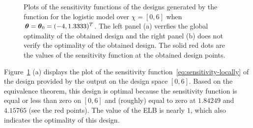   \begin{figure}[h!]
\centering
{}
\caption{
  Plots of the  sensitivity functions  of the designs generated by  the  function for the logistic model over  $\chi =  [0, 6]$ when $\boldsymbol{\theta} = \boldsymbol{\theta}_0 =(-4, 1.3333)^T$. The left panel (a) verrfies the global optimality of the obtained design and the right panel (b) does not verify the optimality of the obtained design. The solid red dots are the values of the sensitivity function at the obtained design points.
}
\label{fig:sensitivity-logistic-locally}
\end{figure}


Figure~\ref{fig:sensitivity-logistic-locally} (a) displays the plot of the sensitivity function~\eqref{eq:sensitivity-locally}  of  the design provided by the output on the design space $[0,6]$. Based on the equivalence theorem, this design is optimal because  the sensitivity function is equal or less than zero on $[0,6]$ and (roughly) equal to zero at  $1.84249$ and $4.15765$  (see the red points).  The value of the ELB is nearly $1$, which also indicates the optimality of this design.

